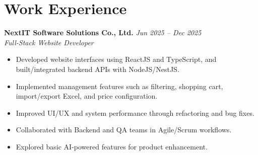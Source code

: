 \section{Work Experience}

\textbf{NextIT Software Solutions Co., Ltd.} \hfill \textit{Jun 2025 -- Dec 2025}\\
\textit{Full-Stack Website Developer}

\begin{itemize}
  \item Developed website interfaces using ReactJS and TypeScript, and built/integrated backend APIs with NodeJS/NestJS.
  \item Implemented management features such as filtering, shopping cart, import/export Excel, and price configuration.
  \item Improved UI/UX and system performance through refactoring and bug fixes.
  \item Collaborated with Backend and QA teams in Agile/Scrum workflows.
  \item Explored basic AI-powered features for product enhancement.
\end{itemize}
